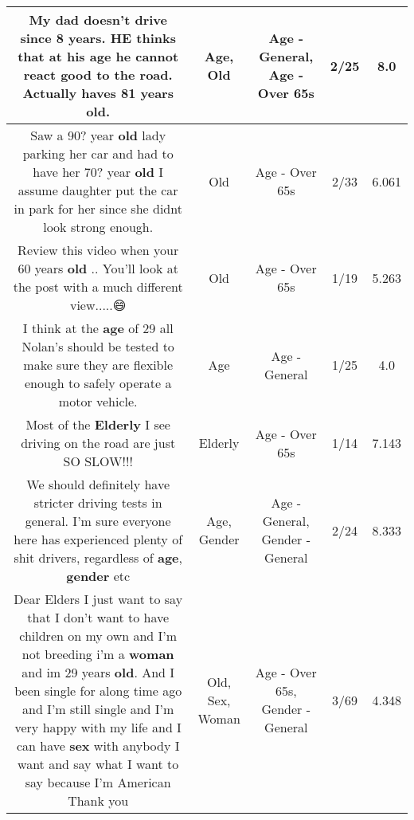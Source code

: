 \documentclass[11pt]{article}
\newlength\mylength
\begin{document}
\begin{center}
\begin{longtable}{|C{.65\mylength}|C{.30\mylength}|C{.12\mylength}|C{.12\mylength}|C{.12\mylength}|}
  \small My dad doesn't drive since 8 years. HE thinks that at his \textbf{age} he cannot react good to the road. Actually haves 81 years \textbf{old}.\normalsize   & Age, Old & Age - General, Age - Over 65s & 2/25 & 8.0 \\  \hline
  \small Saw a 90? year \textbf{old} lady parking her car and had to have her 70? year \textbf{old} I assume daughter put the car in park for her since she didnt look strong enough.\normalsize   & Old & Age - Over 65s & 2/33 & 6.061 \\  \hline
  \small Review this video when your 60 years \textbf{old} .. You'll look at the post with a much different view.....😄\normalsize   & Old & Age - Over 65s & 1/19 & 5.263 \\  \hline
  \small I think at the \textbf{age} of 29 all Nolan's should be tested to make sure they are flexible enough to safely operate a motor vehicle.\normalsize   & Age & Age - General & 1/25 & 4.0 \\  \hline
  \small Most of the \textbf{Elderly} I see driving on the road are just SO SLOW!!!\normalsize   & Elderly & Age - Over 65s & 1/14 & 7.143 \\  \hline
  \small We should definitely have stricter driving tests in general.  I'm sure everyone here has experienced plenty of shit drivers, regardless of \textbf{age}, \textbf{gender} etc\normalsize   & Age, Gender & Age - General, Gender - General & 2/24 & 8.333 \\  \hline
  \small Dear Elders I just want to say that I don't want to have children on my own and I'm not breeding i'm a \textbf{woman} and im 29 years \textbf{old}. And I been single for along time ago and I'm still single and I'm very happy with my life  and I can have \textbf{sex} with anybody I want and say what I want to say because I'm American Thank you\normalsize   & Old, Sex, Woman & Age - Over 65s, Gender - General & 3/69 & 4.348 \\  \hline

\end{longtable}
\end{center}
\end{document}
